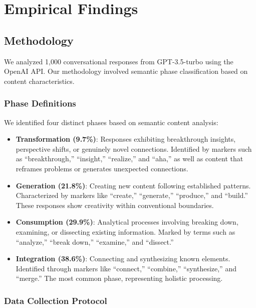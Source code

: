 \documentclass[mlmain]{jmlr}
\begin{document}
\section{Empirical Findings}

\subsection{Methodology}

We analyzed 1,000 conversational responses from GPT-3.5-turbo using the OpenAI API. Our methodology involved semantic phase classification based on content characteristics.

\subsubsection{Phase Definitions}

We identified four distinct phases based on semantic content analysis:

\begin{itemize}
\item \textbf{Transformation (9.7\%)}: Responses exhibiting breakthrough insights, perspective shifts, or genuinely novel connections. Identified by markers such as ``breakthrough,'' ``insight,'' ``realize,'' and ``aha,'' as well as content that reframes problems or generates unexpected connections.

\item \textbf{Generation (21.8\%)}: Creating new content following established patterns. Characterized by markers like ``create,'' ``generate,'' ``produce,'' and ``build.'' These responses show creativity within conventional boundaries.

\item \textbf{Consumption (29.9\%)}: Analytical processes involving breaking down, examining, or dissecting existing information. Marked by terms such as ``analyze,'' ``break down,'' ``examine,'' and ``dissect.''

\item \textbf{Integration (38.6\%)}: Connecting and synthesizing known elements. Identified through markers like ``connect,'' ``combine,'' ``synthesize,'' and ``merge.'' The most common phase, representing holistic processing.
\end{itemize}

\subsubsection{Data Collection Protocol}
\end{document}
